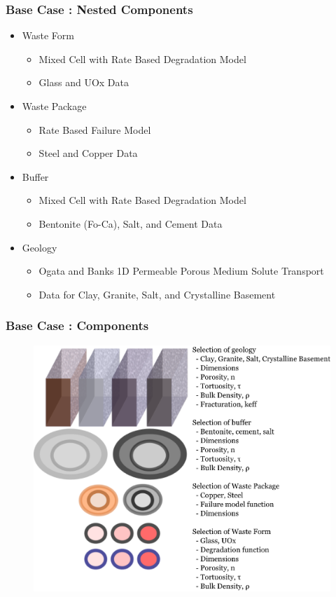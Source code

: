 

\begin{frame}
  \frametitle{Base Case : Nested Components}
  \begin{itemize}
    \item Waste Form
      \begin{itemize}
        \item Mixed Cell with  Rate Based Degradation Model
        \item Glass and UOx Data
      \end{itemize}
    \item Waste Package
      \begin{itemize}
        \item Rate Based Failure Model
        \item Steel and Copper Data
      \end{itemize}
    \item Buffer
      \begin{itemize}
        \item Mixed Cell with  Rate Based Degradation Model
        \item Bentonite (Fo-Ca), Salt, and Cement Data
      \end{itemize}
    \item Geology
      \begin{itemize}
        \item Ogata and Banks 1D Permeable Porous Medium Solute Transport
        \item Data for Clay, Granite, Salt, and Crystalline Basement
      \end{itemize}
  \end{itemize}
\end{frame}

\begin{frame}[ctb!]
  \frametitle{Base Case : Components}
  \begin{figure}[h!]
      \includegraphics[height=0.8\textheight]{./images/components.eps}
  \end{figure}
\end{frame}

